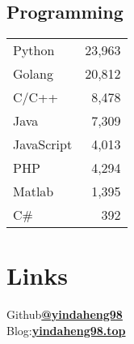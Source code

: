 \documentclass[]{deedy-resume-openfont}
\begin{document}
\begin{minipage}[t]{0.22\textwidth}
\subsection{Programming }
\begin{tabular}{lr}
    Python     & 23,963 \\ %
    Golang 	   & 20,812 \\ %
    C/C++      & 8,478  \\ %
    Java       & 7,309  \\ %
    JavaScript & 4,013  \\ %
    PHP        & 4,294  \\ %
    Matlab     & 1,395  \\ %
    C\#        & 392    \\ %
\end{tabular}
\sectionsep

\section{Links}
Github\href{https://github.com/yindaheng98}{\bf @yindaheng98} \\
Blog:\href{http://www.yindaheng98.top}{\bf yindaheng98.top} \\
\sectionsep

\end{minipage} 
\hfill
\end{document}
